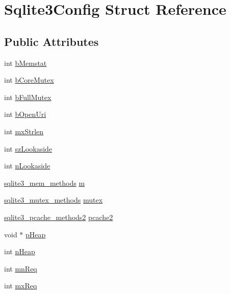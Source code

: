 \hypertarget{struct_sqlite3_config}{\section{Sqlite3\-Config Struct Reference}
\label{struct_sqlite3_config}
}
\subsection*{Public Attributes}
\begin{DoxyCompactItemize}
\item 
int \hyperlink{struct_sqlite3_config_aae01de5f37a66422f2a7413e108e03fe}{b\-Memstat}
\item 
int \hyperlink{struct_sqlite3_config_a202216a82e0823d0a4629c4884215a54}{b\-Core\-Mutex}
\item 
int \hyperlink{struct_sqlite3_config_aab880bf54370cd0f6210afce0fb646ee}{b\-Full\-Mutex}
\item 
int \hyperlink{struct_sqlite3_config_af446c9f0657e5564b4dbba3421ffc8be}{b\-Open\-Uri}
\item 
int \hyperlink{struct_sqlite3_config_a66f1f85ec9b7724f7fe0bebad61a634f}{mx\-Strlen}
\item 
int \hyperlink{struct_sqlite3_config_ad7504c4c1867db9837b40d7c22ba7582}{sz\-Lookaside}
\item 
int \hyperlink{struct_sqlite3_config_a2519388eb9688eb3dbdc9b279ee73e0a}{n\-Lookaside}
\item 
\hyperlink{structsqlite3__mem__methods}{sqlite3\-\_\-mem\-\_\-methods} \hyperlink{struct_sqlite3_config_a922ec99508e346db8e4fbaec58aa1ff9}{m}
\item 
\hyperlink{structsqlite3__mutex__methods}{sqlite3\-\_\-mutex\-\_\-methods} \hyperlink{struct_sqlite3_config_afa8189b51142fd800d1dee1987187f61}{mutex}
\item 
\hyperlink{structsqlite3__pcache__methods2}{sqlite3\-\_\-pcache\-\_\-methods2} \hyperlink{struct_sqlite3_config_ab1504fcfc7d18b64e26554a644ed9f6d}{pcache2}
\item 
void $\ast$ \hyperlink{struct_sqlite3_config_a52f66f1870b47adde44507d6bd523113}{p\-Heap}
\item 
int \hyperlink{struct_sqlite3_config_a06d6d22e0fca1b713f9c7a110a89abba}{n\-Heap}
\item 
int \hyperlink{struct_sqlite3_config_a2abbe78d2443b7408a01f59299da1174}{mn\-Req}
\item 
int \hyperlink{struct_sqlite3_config_a060f9ef5a2bda888a8253229384ab4a9}{mx\-Req}

\end{DoxyCompactItemize}
